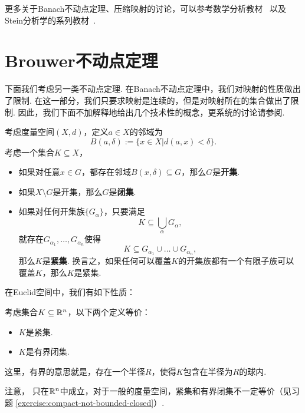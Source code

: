 \begin{remark}
    更多关于Banach不动点定理、压缩映射的讨论，可以参考数学分析教材~\cite{zorichMathematicalAnalysisII2016} 以及Stein分析学的系列教材~\cite{steinRealAnalysisMeasure2005,steinFunctionalAnalysisIntroduction2011}.
\end{remark}

\section{Brouwer不动点定理}

下面我们考虑另一类不动点定理. 在Banach不动点定理中，我们对映射的性质做出了限制. 在这一部分，我们只要求映射是连续的，但是对映射所在的集合做出了限制. 因此，我们下面不加解释地给出几个技术性的概念，更系统的讨论请参阅.

\begin{definition}[开集、闭集和紧集]
    考虑度量空间$(X,d)$，定义$a\in X$的邻域为
    \[B(a,\delta):=\{x\in X|d(a,x)<\delta\}.\]
    考虑一个集合$K\subseteq X$，
\begin{itemize}
    \item 如果对任意$x\in G$，都存在邻域$B(x,\delta)\subseteq G$，那么$G$是\textbf{开集}.
    \item 如果$X\setminus G$是开集，那么$G$是\textbf{闭集}.
    \item 如果对任何开集族$\{G_\alpha\}$，只要满足
    \[K\subseteq \bigcup_\alpha G_\alpha,\]
    就存在$G_{\alpha_1},\dots,G_{\alpha_n}$使得
    \[K\subseteq G_{\alpha_1}\cup\dots\cup G_{\alpha_n},\]
    那么$K$是\textbf{紧集}. 换言之，如果任何可以覆盖$K$的开集族都有一个有限子族可以覆盖$K$，那么$K$是紧集.
\end{itemize}
\end{definition}

在Euclid空间中，我们有如下性质：

\begin{theorem}\label{thm:compact-set-iff-bounded-closed}
    考虑集合$K\subseteq\mathbb{R}^n$，以下两个定义等价：
    \begin{itemize}
        \item $K$是紧集.
        \item $K$是有界闭集.
    \end{itemize}
\end{theorem}
这里，有界的意思就是，存在一个半径$R$，使得$K$包含在半径为$R$的球内. 

注意， 只在$\mathbb{R}^n$中成立，对于一般的度量空间，紧集和有界闭集不一定等价（见习题 \ref{exercise:compact-not-bounded-closed}）. 

